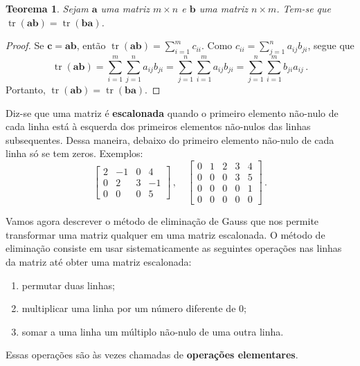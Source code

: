 \documentclass[12pt,a4paper]{report}
\newcommand{\tb}{\textbf}
\newcommand{\mb}{\mathbf}
\newtheorem{thm}{Teorema}[chapter]
\DeclareMathOperator{\tr}{tr}
\begin{document}
\begin{thm}
  Sejam $\mb a$ uma matriz $m\times n$ e $\mb b$ uma matriz $n\times m$. Tem-se que $\tr(\mb {ab})=\tr(\mb{ba})$.
\end{thm}
\begin{proof}
  Se $\mb c=\mb a\mb b$, então $\tr(\mb {ab})=\sum_{i=1}^m c_{ii}$. Como $c_{ii}=\sum_{j=1}^na_{ij}b_{ji}$, segue que
  $$\tr(\mb{ab})=\sum_{i=1}^m\sum_{j=1}^na_{ij}b_{ji}=\sum_{j=1}^n\sum_{i=1}^ma_{ij}b_{ji}=\sum_{j=1}^n\sum_{i=1}^mb_{ji}a_{ij}\,.$$
  Portanto, $\tr(\mb{ab})=\tr(\mb{ba})$.
\end{proof}

Diz-se que uma matriz é \tb{escalonada} quando o primeiro elemento não-nulo de cada linha está à esquerda dos primeiros elementos não-nulos das linhas subsequentes. Dessa maneira, debaixo do primeiro elemento não-nulo de cada linha só se tem zeros. Exemplos:
$$\begin{bmatrix}
  2&-1&0&4\\
  0&2&3&-1\\
  0&0&0&5
\end{bmatrix}\,,\quad \begin{bmatrix}
  0&1&2&3&4\\
  0&0&0&3&5\\
  0&0&0&0&1\\
  0&0&0&0&0
\end{bmatrix}\,.$$

Vamos agora descrever o método de eliminação de Gauss que nos permite transformar uma matriz qualquer em uma matriz escalonada. O método de eliminação consiste em usar sistematicamente as seguintes operações nas linhas da matriz até obter uma matriz escalonada:
\begin{enumerate}
  \item permutar duas linhas;
  \item multiplicar uma linha por um número diferente de $0$;
  \item somar a uma linha um múltiplo não-nulo de uma outra linha.
\end{enumerate}
Essas operações são às vezes chamadas de \tb{operações elementares}.
\end{document}
